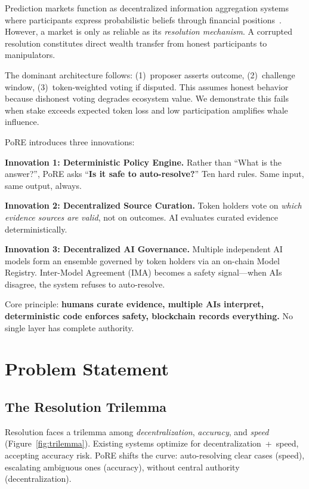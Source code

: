 \documentclass[11pt,a4paper,twocolumn]{article}
\begin{document}
Prediction markets function as decentralized information aggregation systems where participants express probabilistic beliefs through financial positions~\cite{wolfers2004}. However, a market is only as reliable as its \emph{resolution mechanism}. A corrupted resolution constitutes direct wealth transfer from honest participants to manipulators.

The dominant architecture follows: (1)~proposer asserts outcome, (2)~challenge window, (3)~token-weighted voting if disputed. This assumes honest behavior because dishonest voting degrades ecosystem value. We demonstrate this fails when stake exceeds expected token loss and low participation amplifies whale influence.

PoRE introduces three innovations:

\textbf{Innovation 1: Deterministic Policy Engine.} Rather than ``What is the answer?'', PoRE asks ``\textbf{Is it safe to auto-resolve?}'' Ten hard rules. Same input, same output, always.

\textbf{Innovation 2: Decentralized Source Curation.} Token holders vote on \emph{which evidence sources are valid}, not on outcomes. AI evaluates curated evidence deterministically.

\textbf{Innovation 3: Decentralized AI Governance.} Multiple independent AI models form an ensemble governed by token holders via an on-chain Model Registry. Inter-Model Agreement (IMA) becomes a safety signal---when AIs disagree, the system refuses to auto-resolve.

Core principle: \textbf{humans curate evidence, multiple AIs interpret, deterministic code enforces safety, blockchain records everything.} No single layer has complete authority.

\section{Problem Statement}

\subsection{The Resolution Trilemma}

Resolution faces a trilemma among \emph{decentralization}, \emph{accuracy}, and \emph{speed} (Figure~\ref{fig:trilemma}). Existing systems optimize for decentralization~+~speed, accepting accuracy risk. PoRE shifts the curve: auto-resolving clear cases (speed), escalating ambiguous ones (accuracy), without central authority (decentralization).
\end{document}
